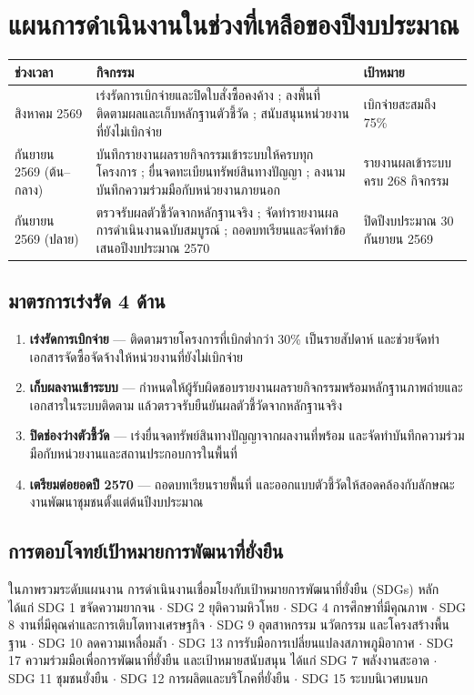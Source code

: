 \documentclass[12pt,a4paper]{article}
\begin{document}
\clearpage
\section{แผนการดำเนินงานในช่วงที่เหลือของปีงบประมาณ}

\begin{center}\small
\setlength{\tabcolsep}{6pt}\renewcommand{\arraystretch}{1.35}
\begin{tabular}{p{1.9cm}p{9.4cm}p{3.4cm}}
\toprule
\rowcolor{rpfnavy!12}
\textbf{ช่วงเวลา} & \textbf{กิจกรรม} & \textbf{เป้าหมาย}\\
\midrule
สิงหาคม 2569 & เร่งรัดการเบิกจ่ายและปิดใบสั่งซื้อคงค้าง ; ลงพื้นที่ติดตามผลและเก็บหลักฐานตัวชี้วัด ; สนับสนุนหน่วยงานที่ยังไม่เบิกจ่าย & เบิกจ่ายสะสมถึง 75\%\\
กันยายน 2569 (ต้น--กลาง) & บันทึกรายงานผลรายกิจกรรมเข้าระบบให้ครบทุกโครงการ ; ยื่นจดทะเบียนทรัพย์สินทางปัญญา ; ลงนามบันทึกความร่วมมือกับหน่วยงานภายนอก & รายงานผลเข้าระบบครบ 268 กิจกรรม\\
กันยายน 2569 (ปลาย) & ตรวจรับผลตัวชี้วัดจากหลักฐานจริง ; จัดทำรายงานผลการดำเนินงานฉบับสมบูรณ์ ; ถอดบทเรียนและจัดทำข้อเสนอปีงบประมาณ 2570 & ปิดปีงบประมาณ 30 กันยายน 2569\\
\bottomrule
\end{tabular}
\end{center}

\subsection{มาตรการเร่งรัด 4 ด้าน}
\begin{enumerate}[leftmargin=1.6em,itemsep=2pt]
  \item \textbf{เร่งรัดการเบิกจ่าย} --- ติดตามรายโครงการที่เบิกต่ำกว่า 30\% เป็นรายสัปดาห์ และช่วยจัดทำเอกสารจัดซื้อจัดจ้างให้หน่วยงานที่ยังไม่เบิกจ่าย
  \item \textbf{เก็บผลงานเข้าระบบ} --- กำหนดให้ผู้รับผิดชอบรายงานผลรายกิจกรรมพร้อมหลักฐานภาพถ่ายและเอกสารในระบบติดตาม แล้วตรวจรับยืนยันผลตัวชี้วัดจากหลักฐานจริง
  \item \textbf{ปิดช่องว่างตัวชี้วัด} --- เร่งยื่นจดทรัพย์สินทางปัญญาจากผลงานที่พร้อม และจัดทำบันทึกความร่วมมือกับหน่วยงานและสถานประกอบการในพื้นที่
  \item \textbf{เตรียมต่อยอดปี 2570} --- ถอดบทเรียนรายพื้นที่ และออกแบบตัวชี้วัดให้สอดคล้องกับลักษณะงานพัฒนาชุมชนตั้งแต่ต้นปีงบประมาณ
\end{enumerate}

\subsection{การตอบโจทย์เป้าหมายการพัฒนาที่ยั่งยืน}
ในภาพรวมระดับแผนงาน การดำเนินงานเชื่อมโยงกับเป้าหมายการพัฒนาที่ยั่งยืน (SDGs) หลัก ได้แก่
SDG 1 ขจัดความยากจน $\cdot$ SDG 2 ยุติความหิวโหย $\cdot$ SDG 4 การศึกษาที่มีคุณภาพ $\cdot$
SDG 8 งานที่มีคุณค่าและการเติบโตทางเศรษฐกิจ $\cdot$ SDG 9 อุตสาหกรรม นวัตกรรม และโครงสร้างพื้นฐาน $\cdot$
SDG 10 ลดความเหลื่อมล้ำ $\cdot$ SDG 13 การรับมือการเปลี่ยนแปลงสภาพภูมิอากาศ $\cdot$
SDG 17 ความร่วมมือเพื่อการพัฒนาที่ยั่งยืน
และเป้าหมายสนับสนุน ได้แก่ SDG 7 พลังงานสะอาด $\cdot$ SDG 11 ชุมชนยั่งยืน $\cdot$
SDG 12 การผลิตและบริโภคที่ยั่งยืน $\cdot$ SDG 15 ระบบนิเวศบนบก
\end{document}
